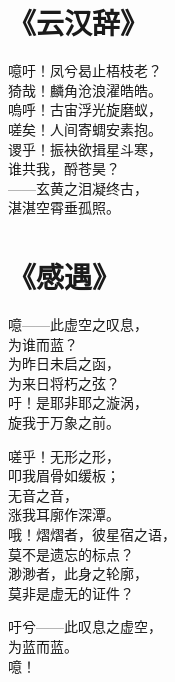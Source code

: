 \clearpage


\section{《云汉辞》}

噫吁！凤兮曷止梧枝老？ \\
猗哉！麟角沧浪濯皓皓。 \\
嗚呼！古宙浮光旋磨蚁， \\
嗟矣！人间寄蜩安素抱。 \\
谡乎！振袂欲揖星斗寒， \\
谁共我，酹苍昊？ \\
——玄黄之泪凝终古， \\
湛湛空霄垂孤照。

\clearpage


\section{《感遇》}

噫——此虚空之叹息， \\
为谁而蓝？ \\
为昨日未启之函， \\
为来日将朽之弦？ \\
吁！是耶非耶之漩涡， \\
旋我于万象之前。
\vspace{1em}

嗟乎！无形之形， \\
叩我眉骨如缓板； \\
无音之音， \\
涨我耳廓作深潭。 \\
哦！熠熠者，彼星宿之语， \\
莫不是遗忘的标点？ \\
渺渺者，此身之轮廓， \\
莫非是虚无的证件？
\vspace{1em}

吁兮——此叹息之虚空， \\
为蓝而蓝。 \\
噫！

\clearpage





